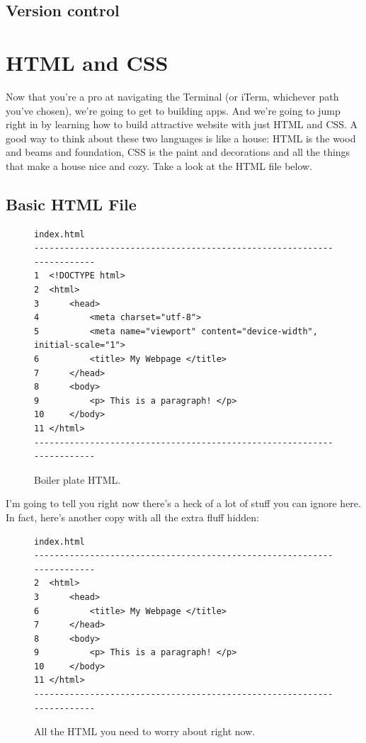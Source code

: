 \documentclass[11pt, letterpaper]{article}
\begin{document}
\subsection*{Version control}

\section{HTML and CSS}

Now that you're a pro at navigating the Terminal (or iTerm, whichever path you've chosen), we're going to get to building
apps. And we're going to jump right in by learning how to build attractive website with just HTML and CSS. A good
way to think about these two languages is like a house: HTML is the wood and beams and foundation, CSS is the paint
and decorations and all the things that make a house nice and cozy. Take a look at the HTML file below. \\

\subsection*{Basic HTML File}

\begin{figure}[ht]
\centering
\begin{BVerbatim}
index.html
-----------------------------------------------------------------------
1  <!DOCTYPE html>
2  <html>
3      <head>
4          <meta charset="utf-8">
5          <meta name="viewport" content="device-width", initial-scale="1">
6          <title> My Webpage </title>
7      </head>
8      <body>
9          <p> This is a paragraph! </p>
10     </body>
11 </html>
-----------------------------------------------------------------------
\end{BVerbatim}
\caption{Boiler plate HTML.}
\end{figure}


I'm going to tell you right now there's a heck of a lot of stuff you can ignore here. In fact, here's another copy with 
all the extra fluff hidden: \\

\begin{figure}[ht]
\centering
\begin{BVerbatim}
index.html
-----------------------------------------------------------------------
2  <html>
3      <head>
6          <title> My Webpage </title>
7      </head>
8      <body>
9          <p> This is a paragraph! </p>
10     </body>
11 </html>
-----------------------------------------------------------------------
\end{BVerbatim}
\caption{All the HTML you need to worry about right now.}
\end{figure}
\end{document}
